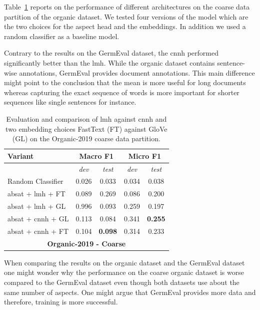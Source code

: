 \bigskip
Table~\ref{tab:06_resultsOrganic2} reports on the performance of different architectures on the coarse data partition of the organic dataset. We tested four versions of the model which are the two choices for the aspect head and the embeddings. In addition we used a random classifier as a baseline model.
\medskip

Contrary to the results on the GermEval dataset, the \acrfull{cnnh} performed significantly better than the \acrfull{lmh}. While the organic dataset contains sentence-wise annotations, GermEval provides document annotations. This main difference might point to the conclusion that the mean is more useful for long documents whereas capturing the exact sequence of words is more important for shorter sequences like single sentences for instance. 
\bigskip

\begin{table}[htb]
	\centering
	\begin{tabular*}{\textwidth}{l@{\extracolsep{\fill}}cccc@{}}
	\toprule
	Variant          & \multicolumn{2}{c}{\textbf{Macro F1}}     & \multicolumn{2}{c}{\textbf{Micro F1}}       \\ 
	\midrule
					 & \textit{dev}      	& \textit{test} 		& \textit{dev}      		& \textit{test} 		\\
	\midrule

	Random Classifier          		&  0.026 		& 0.033&  0.034 &   0.038  				\\
	\gls{absat} + \gls{lmh} + FT    & 0.089     & 0.269	&  0.086 &   0.200   			\\ 
	\gls{absat} + \gls{lmh} + GL    & 0.996     & 0.093	&  0.259 &   0.197   			\\ 

	\gls{absat} + \gls{cnnh} + GL   & 0.113     & 0.084	& 0.341   &  \textbf{0.255} 				\\ 	
	\gls{absat} + \gls{cnnh} + FT   & 0.104     & \textbf{0.098} & 0.314  &   0.233				\\ 
	\bottomrule
	\multicolumn{5}{c}{\textbf{Organic-2019 - Coarse}} \\
	\end{tabular*}
	\caption{Evaluation and comparison of \acrfull{lmh} against \acrfull{cnnh} and two embedding choices FastText {(FT)} against GloVe {(GL)} on the Organic-2019 coarse data partition.}
	\label{tab:06_resultsOrganic2}
\end{table}

When comparing the results on the organic dataset and the GermEval dataset one might wonder why the performance on the coarse organic dataset is worse compared to the GermEval dataset even though both datasets use about the same number of aspects. One might argue that GermEval provides more data and therefore, training is more successful.


